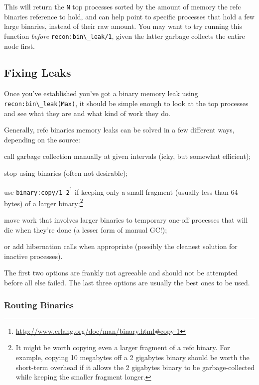\documentclass[11pt, oneside]{book}   	%
\newcommand{\function}[1]{\Verb`#1`}
\newcommand{\var}[1]{\Verb`#1`}
\begin{document}
This will return the \var{N} top processes sorted by the amount of memory the refc binaries reference to hold, and can help point to specific processes that hold a few large binaries, instead of their raw amount. You may want to try running this function \emph{before} \function{recon:bin\_leak/1}, given the latter garbage collects the entire node first.

\subsection{Fixing Leaks}

Once you've established you've got a binary memory leak using \function{recon:bin\_leak(Max)}, it should be simple enough to look at the top processes and see what they are and what kind of work they do.

Generally, refc binaries memory leaks can be solved in a few different ways, depending on the source:

\begin{itemize*}
	\item call garbage collection manually at given intervals (icky, but somewhat efficient);
	\item stop using binaries (often not desirable);
	\item use \function{binary:copy/1-2}\footnote{\href{http://www.erlang.org/doc/man/binary.html\#copy-1}{http://www.erlang.org/doc/man/binary.html\#copy-1}} if keeping only a small fragment (usually less than 64 bytes) of a larger binary;\footnote{It might be worth copying even a larger fragment of a refc binary. For example, copying 10 megabytes off a 2 gigabytes binary should be worth the short-term overhead if it allows the 2 gigabytes binary to be garbage-collected while keeping the smaller fragment longer.}
	\item move work that involves larger binaries to temporary one-off processes that will die when they're done (a lesser form of manual GC!);
	\item or add hibernation calls when appropriate (possibly the cleanest solution for inactive processes).
\end{itemize*}

The first two options are frankly not agreeable and should not be attempted before all else failed. The last three options are usually the best ones to be used.

\subsubsection{Routing Binaries}
\end{document}
